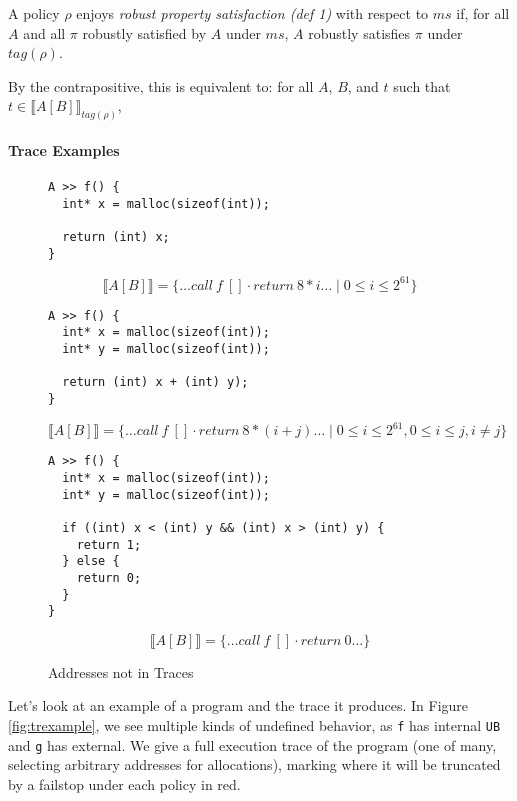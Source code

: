 \documentclass{article}
\begin{document}
A policy \(\rho\) enjoys {\em robust property satisfaction (def 1)} with respect to \(ms\)
if, for all \(A\) and all \(\pi\) robustly satisfied by \(A\) under \(ms\),
\(A\) robustly satisfies \(\pi\) under \(tag(\rho)\).

By the contrapositive, this is equivalent to: for all \(A\), \(B\), and \(t\) such that
\(t \in \llbracket A[B] \rrbracket_{tag(\rho)}\),

\paragraph{Trace Examples}

\begin{figure}

\begin{verbatim}
A >> f() {
  int* x = malloc(sizeof(int));
  
  return (int) x;
}
\end{verbatim}

\[\llbracket A[B] \rrbracket =
\{\dots \mathit{call} ~ f ~ [] \cdot \mathit{return} ~ 8*i \ldots \mid 0 \leq i \leq 2^{61}\}\]

\begin{verbatim}
A >> f() {
  int* x = malloc(sizeof(int));
  int* y = malloc(sizeof(int));
  
  return (int) x + (int) y);
}
\end{verbatim}

\[\llbracket A[B] \rrbracket =
\{\dots \mathit{call} ~ f ~ [] \cdot \mathit{return} ~ 8*(i+j) \ldots \mid 0 \leq i \leq 2^{61}, 0 \leq i \leq j, i \not = j\}\]

\begin{verbatim}
A >> f() {
  int* x = malloc(sizeof(int));
  int* y = malloc(sizeof(int));

  if ((int) x < (int) y && (int) x > (int) y) {
    return 1;
  } else {
    return 0;
  }
}
\end{verbatim}

\[\llbracket A[B] \rrbracket = \{\dots \mathit{call} ~ f ~ [] \cdot \mathit{return} ~ 0 \ldots\}\]

\caption{Addresses not in Traces}
\label{fig:traddr}
\end{figure}




Let's look at an example of a program and the trace it produces. In Figure \ref{fig:trexample},
we see multiple kinds of undefined behavior, as {\tt f} has internal {\tt UB} and {\tt g} has
external. We give a full execution trace of the program (one of many, selecting arbitrary addresses
for allocations), marking where it will be truncated by a failstop under each policy in red.
\end{document}
